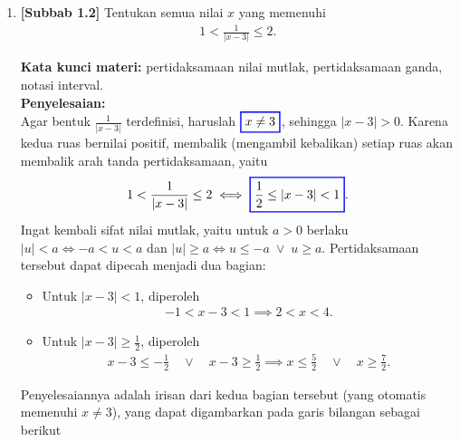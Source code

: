 \documentclass[10pt,openany,a4paper]{article}
\theoremstyle{definition}
\theoremstyle{definition}
\theoremstyle{plain}
\newenvironment{jawab}[2][tes]{%
\par\noindent\textbf{Kata kunci materi:} #1.\\
\textbf{Penyelesaian:} #2%
}{}
\begin{document}
\begin{enumerate}
    \item \textbf{[Subbab 1.2]} Tentukan semua nilai $x$ yang memenuhi
    \begin{align*}
        1<\frac{1}{|x-3|}\leq 2.
    \end{align*}
    \begin{jawab}[pertidaksamaan nilai mutlak, pertidaksamaan ganda, notasi interval]{~\\
        Agar bentuk $\frac{1}{|x-3|}$ terdefinisi, haruslah $\colorlet{oldcolor}{.}
        \color{blue}
        \setlength{\fboxrule}{1pt} \boxed{\color{oldcolor}x\neq 3}\color{oldcolor}$, sehingga $|x-3|>0$. Karena kedua ruas bernilai positif, membalik (mengambil kebalikan) setiap ruas akan membalik arah tanda pertidaksamaan, yaitu
        \begin{align*}
            1<\frac{1}{|x-3|}\leq 2 \iff \colorlet{oldcolor}{.}
        \color{blue}
        \setlength{\fboxrule}{1pt} \boxed{\color{oldcolor}\frac{1}{2}\leq |x-3|<1}\color{oldcolor}.
        \end{align*}
        Ingat kembali sifat nilai mutlak, yaitu untuk $a>0$ berlaku $|u|<a \iff -a<u<a$ dan $|u|\geq a \iff u\leq -a \;\vee\; u\geq a$. Pertidaksamaan tersebut dapat dipecah menjadi dua bagian:
        \begin{itemize}
            \item Untuk $|x-3|<1$, diperoleh
            \begin{align*}
                -1<x-3<1 \implies 2<x<4.
            \end{align*}
            \item Untuk $|x-3|\geq \frac{1}{2}$, diperoleh
            \begin{align*}
                x-3\leq -\frac{1}{2} \quad\vee\quad x-3\geq \frac{1}{2} \implies x\leq \frac{5}{2} \quad\vee\quad x\geq \frac{7}{2}.
            \end{align*}
        \end{itemize}
        Penyelesaiannya adalah irisan dari kedua bagian tersebut (yang otomatis memenuhi $x\neq 3$), yang dapat digambarkan pada garis bilangan sebagai berikut
        \begin{center}
            \begin{tikzpicture}

\end{tikzpicture}
\end{center}}
\end{jawab}
\end{enumerate}
\end{document}

